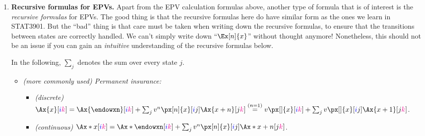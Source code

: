 \begin{enumerate}


\item \label{it:mult-state-epv-recursive-fmlas} \textbf{Recursive formulas for EPVs.} Apart from the EPV calculation
formulas above, another type of formula that is of interest is the
\emph{recursive formulas} for EPVs. The good  thing
is that the recursive formulas here do have similar form as the ones we learn
in STAT3901. But the ``bad''  thing is that care
must be taken when writing down the recursive formulas, to ensure that the
transitions between states are correctly handled. We can't simply write down
``\(\Ex[n]{x}\)'' without thought anymore! Nonetheless, this should not be an issue if
you can gain an \emph{intuitive} understanding of the recursive formulas below.
\begin{note}
In the following, \(\sum_{j}^{}\) denotes the sum over every state \(j\).
\end{note}
\begin{itemize}
\item \emph{(more commonly used) Permanent insurance:}
\begin{itemize}
\item \emph{(discrete)} \(\Ax{x}[\blc{i}\mgc{k}]
=\Ax{\endowxn}[\blc{i}\mgc{k}]+\sum_{j}^{}v^{n}\px[n]{x}[\blc{i}j]\Ax{x+n}[j\mgc{k}]
\overset{(n=1)}{=}v\px[]{x}[\blc{i}\mgc{k}]+\sum_{j}^{}v\px[]{x}[\blc{i}j]\Ax{x+1}[j\mgc{k}]\).
\item \emph{(continuous)} \(\Ax*{x}[\blc{i}\mgc{k}]=\Ax*{\endowxn}[\blc{i}\mgc{k}]
+\sum_{j}^{}v^{n}\px[n]{x}[\blc{i}j]\Ax*{x+n}[j\mgc{k}]\).
\end{itemize}
\begin{center}
\end{center}
\end{itemize}
\end{enumerate}

